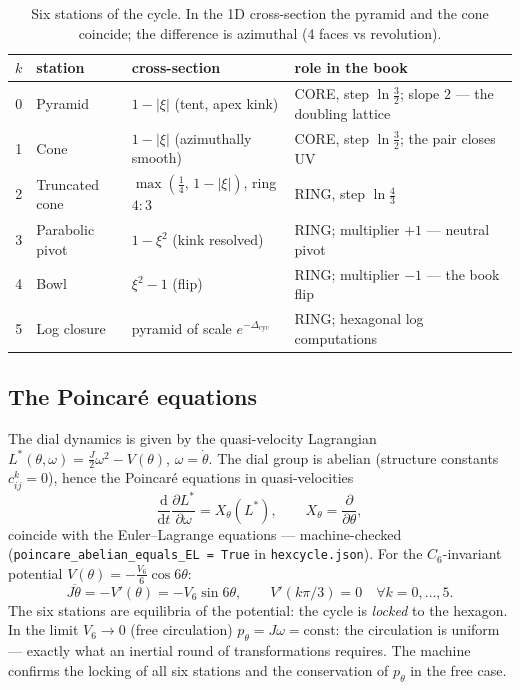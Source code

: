 \documentclass[11pt,a4paper]{article}
\newcommand{\dd}{\mathrm{d}}
\newcommand{\Dcy}{\Delta_{\mathrm{cyc}}}
\begin{document}
\begin{table}[h]
\centering\small
{}
\begin{tabularx}{\textwidth}{c l Y Y}
\toprule
$k$ & station & cross-section & role in the book \\
 & Pyramid & $1-|\xi|$ (tent, apex kink) & CORE, step $\ln\frac32$; slope $2$ --- the doubling lattice \\
1 & Cone & $1-|\xi|$ (azimuthally smooth) & CORE, step $\ln\frac32$; the pair closes UV \\
2 & Truncated cone & $\max(\frac14,\, 1-|\xi|)$, ring $4{:}3$ & RING, step $\ln\frac43$ \\
3 & Parabolic pivot & $1-\xi^2$ (kink resolved) & RING; multiplier $+1$ --- neutral pivot \\
4 & Bowl & $\xi^2-1$ (flip) & RING; multiplier $-1$ --- the book flip \\
5 & Log closure & pyramid of scale $e^{-\Dcy}$ & RING; hexagonal log computations \\
\bottomrule
\end{tabularx}
\caption{Six stations of the cycle. In the 1D cross-section the pyramid and
the cone coincide; the difference is azimuthal (4 faces vs revolution).}
\end{table}

\subsection{The Poincar\'e equations}

The dial dynamics is given by the quasi-velocity Lagrangian
$L^*(\theta, \omega) = \frac{J}{2}\omega^2 - V(\theta)$, $\omega = \dot\theta$.
The dial group is abelian (structure constants $c^k_{ij} = 0$), hence the
Poincar\'e equations in quasi-velocities
\begin{equation}
\frac{\dd}{\dd t}\frac{\partial L^*}{\partial \omega} = X_\theta(L^*),
\qquad X_\theta = \frac{\partial}{\partial \theta},
\end{equation}
coincide with the Euler--Lagrange equations --- machine-checked
(\texttt{poincare\_abelian\_equals\_EL = True} in \texttt{hexcycle.json}).
For the $C_6$-invariant potential $V(\theta) = -\frac{V_6}{6}\cos 6\theta$:
\begin{equation}
J\ddot\theta = -V'(\theta) = -V_6 \sin 6\theta, \qquad
V'(k\pi/3) = 0 \quad \forall k = 0,\dots,5.
\end{equation}
The six stations are equilibria of the potential: the cycle is \emph{locked}
to the hexagon. In the limit $V_6 \to 0$ (free circulation)
$p_\theta = J\omega = \text{const}$: the circulation is uniform --- exactly
what an inertial round of transformations requires. The machine confirms the
locking of all six stations and the conservation of $p_\theta$ in the free
case.
\end{document}
